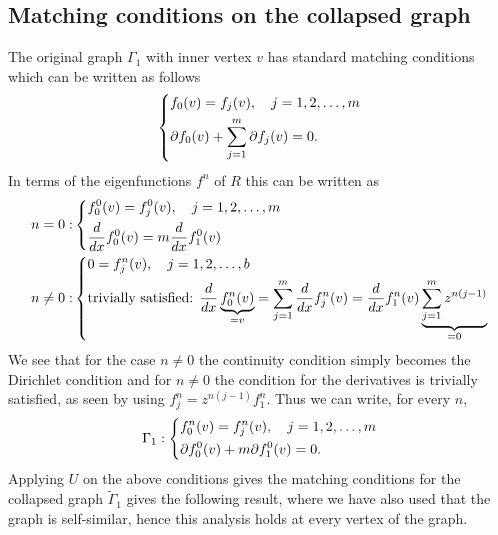 \subsection{Matching conditions on the collapsed graph}

The original graph $\Gamma_1$ with inner vertex $v$ has standard matching conditions which can be written as follows
\[
  \begin{dcases}
    f_0(v) = f_j(v), \quad j = 1, 2, \ldots, m \\
    \partial f_0(v) + \sum_{j=1}^{m} \partial f_j(v) = 0.
  \end{dcases}
\]
In terms of the eigenfunctions $f^n$ of $R$ this can be written as
\begin{align*}
  n = 0: &
  \begin{dcases}
    f^0_0(v) = f^0_j(v), \quad j = 1, 2, \ldots, m  \\
    \frac{d}{dx} f^0_0(v) = m \frac{d}{dx} f^0_1(v)
  \end{dcases} \\
  n \ne 0: &
  \begin{dcases}
    0 = f^n_j(v), \quad j = 1, 2, \ldots, b \\
    \text{trivially satisfied: } \frac{d}{dx} \underbrace{f^n_0(v)}_{=v} = \sum_{j=1}^m \frac{d}{dx} f^n_j(v) = \frac{d}{dx} f^n_1(v) \underbrace{\sum_{j=1}^{m} z^{n(j-1)}}_{=0}
  \end{dcases}
\end{align*}
We see that for the case $n \ne 0$ the continuity condition simply becomes the Dirichlet condition and for $n \ne 0$ the condition for the derivatives is trivially satisfied, as seen by using $f^n_j = z^{n(j-1)} f^n_1$. Thus we can write, for every $n$,
\begin{equation*}
  \Gamma_1:
  \begin{dcases}
    f^n_0(v) = f^n_j(v), \quad j = 1, 2, \ldots, m \\
    \partial f^0_0(v) + m \partial f^0_1(v) = 0.
  \end{dcases}
\end{equation*}
Applying $U$ on the above conditions gives the matching conditions for the collapsed graph $\widetilde{\Gamma}_1$ gives the following result, where we have also used that the graph is self-similar, hence this analysis holds at every vertex of the graph.


